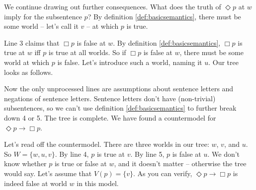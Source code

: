 We continue drawing out further consequences. What does the truth of
$\Diamond p$ at $w$ imply for the subsentence $p$? By definition
\ref{def:basicsemantics}, there must be some world -- let's call it $v$ -- at
which $p$ is true.

\begin{center}
\end{center}

Line 3 claims that $\Box p$ is false at $w$. By definition
\ref{def:basicsemantics}, $\Box p$ is true at $w$ iff $p$ is true at all worlds.
So if $\Box p$ is false at $w$, there must be some world at which $p$ is false.
Let's introduce such a world, naming it $u$. Our tree looks as follows.

\begin{center}
\end{center}

Now the only unprocessed lines are assumptions about sentence letters and
negations of sentence letters. Sentence letters don't have (non-trivial)
subsentences, so we can't use definition \ref{def:basicsemantics} to further
break down 4 or 5. The tree is complete. We have found a countermodel for
$\Diamond p \to \Box p$.

Let's read off the countermodel. There are three worlds in our tree: $w$, $v$,
and $u$. So $W = \{ w, u, v \}$. By line 4, $p$ is true at $v$. By line 5, $p$
is false at $u$. We don't know whether $p$ is true or false at $w$, and it
doesn't matter -- otherwise the tree would say. Let's assume that
$V(p) = \{ v \}$. As you can verify, $\Diamond p\to \Box p$ is indeed false at
world $w$ in this model.

